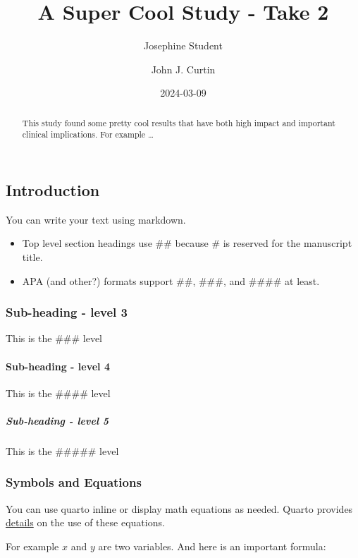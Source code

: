 \documentclass[
  letterpaper,
  DIV=11,
  numbers=noendperiod]{scrartcl}
\title{A Super Cool Study - Take 2}
\author{Josephine Student \and John J. Curtin}
\date{2024-03-09}
\let\oldparagraph\paragraph
\renewcommand{\paragraph}[1]{\oldparagraph{#1}\mbox{}}
\let\oldsubparagraph\subparagraph
\renewcommand{\subparagraph}[1]{\oldsubparagraph{#1}\mbox{}}
\providecommand{\tightlist}{%
  \setlength{\itemsep}{0pt}\setlength{\parskip}{0pt}}\usepackage{longtable,booktabs,array}
\begin{document}
\maketitle
\begin{abstract}
This study found some pretty cool results that have both high impact and
important clinical implications. For example \ldots{}
\end{abstract}

\subsection{Introduction}\label{introduction}

You can write your text using markdown.

\begin{itemize}
\tightlist
\item
  Top level section headings use \#\# because \# is reserved for the
  manuscript title.
\item
  APA (and other?) formats support \#\#, \#\#\#, and \#\#\#\# at least.
\end{itemize}

\subsubsection{Sub-heading - level 3}\label{sub-heading---level-3}

This is the \#\#\# level

\paragraph{Sub-heading - level 4}\label{sub-heading---level-4}

This is the \#\#\#\# level

\subparagraph{Sub-heading - level 5}\label{sub-heading---level-5}

This is the \#\#\#\#\# level

\subsubsection{Symbols and Equations}\label{symbols-and-equations}

You can use quarto inline or display math equations as needed. Quarto
provides
\href{https://quarto.org/docs/authoring/markdown-basics.html\#equations}{details}
on the use of these equations.

For example \(x\) and \(y\) are two variables. And here is an important
formula:
\end{document}
